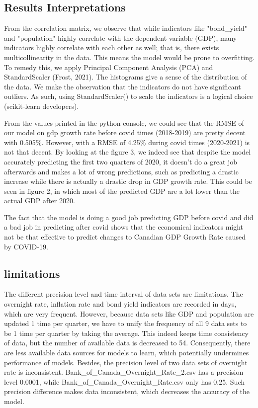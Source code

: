 \documentclass{article}
\begin{document}
\subsection{Results Interpretations}
From the correlation matrix, we observe that while indicators like "bond_yield" and "population" highly correlate with the dependent variable (GDP), many indicators highly correlate with each other as well; that is, there exists multicollinearity in the data. This means the model would be prone to overfitting. To remedy this, we apply Principal Component Analysis (PCA) and StandardScaler (Frost, 2021). The histograms give a sense of the distribution of the data. We make the observation that the indicators do not have significant outliers. As such, using StandardScaler() to scale the indicators is a logical choice (scikit-learn developers).
	
From the values printed in the python console, we could see that the RMSE of our model on gdp growth rate before covid times (2018-2019) are pretty decent with 0.505\%. However, with a RMSE of 4.25\% during covid times (2020-2021) is not that decent. By looking at the figure 3, we indeed see that despite the model accurately predicting the first two quarters of 2020, it doesn’t do a great job afterwards and makes a lot of wrong predictions, such as predicting a drastic increase while there is actually a drastic drop in GDP growth rate. This could be seen in figure 2, in which most of the predicted GDP are a lot lower than the actual GDP after 2020. 
	
The fact that the model is doing a good job predicting GDP before covid and did a bad job in predicting after covid shows that the economical indicators might not be that effective to predict changes to Canadian GDP Growth Rate caused by COVID-19. 
	
	
\subsection{limitations}
The different precision level and time interval of data sets are limitations. The overnight rate, inflation rate and bond yield indicators are recorded in days, which are very frequent. However, because data sets like GDP and population are updated 1 time per quarter, we have to unify the frequency of all 9 data sets to be 1 time per quarter by taking the average. This indeed keeps time consistency of data, but the number of available data is decreased to 54. Consequently, there are less available data sources for models to learn, which potentially undermines performance of models. Besides, the precision level of two data sets of overnight rate is inconsistent. Bank_of_Canada_Overnight_Rate_2.csv has a precision level 0.0001, while Bank_of_Canada_Overnight_Rate.csv only has 0.25. Such precision difference makes data inconsistent, which decreases the accuracy of the model.
\end{document}
